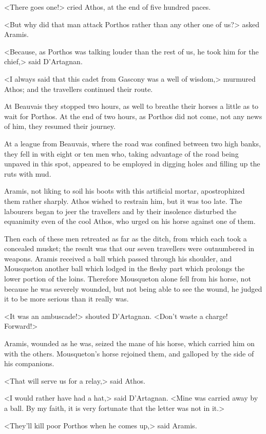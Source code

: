 <There goes one!> cried Athos, at the end of five hundred paces. 

<But why did that man attack Porthos rather than any other one of us?> asked Aramis. 

<Because, as Porthos was talking louder than the rest of us, he took him for the chief,> said D'Artagnan. 

<I always said that this cadet from Gascony was a well of wisdom,> murmured Athos; and the travellers continued their route. 

At Beauvais they stopped two hours, as well to breathe their horses a little as to wait for Porthos. At the end of two hours, as Porthos did not come, not any news of him, they resumed their journey. 

At a league from Beauvais, where the road was confined between two high banks, they fell in with eight or ten men who, taking advantage of the road being unpaved in this spot, appeared to be employed in digging holes and filling up the ruts with mud. 

Aramis, not liking to soil his boots with this artificial mortar, apostrophized them rather sharply. Athos wished to restrain him, but it was too late. The labourers began to jeer the travellers and by their insolence disturbed the equanimity even of the cool Athos, who urged on his horse against one of them. 

Then each of these men retreated as far as the ditch, from which each took a concealed musket; the result was that our seven travellers were outnumbered in weapons. Aramis received a ball which passed through his shoulder, and Mousqueton another ball which lodged in the fleshy part which prolongs the lower portion of the loins. Therefore Mousqueton alone fell from his horse, not because he was severely wounded, but not being able to see the wound, he judged it to be more serious than it really was. 

<It was an ambuscade!> shouted D'Artagnan. <Don't waste a charge! Forward!> 

Aramis, wounded as he was, seized the mane of his horse, which carried him on with the others. Mousqueton's horse rejoined them, and galloped by the side of his companions. 

<That will serve us for a relay,> said Athos. 

<I would rather have had a hat,> said D'Artagnan. <Mine was carried away by a ball. By my faith, it is very fortunate that the letter was not in it.> 

<They'll kill poor Porthos when he comes up,> said Aramis. 

